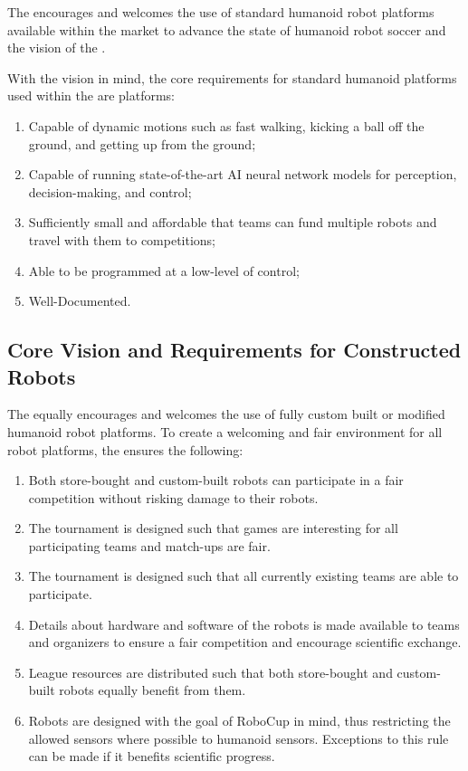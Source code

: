 The \leaguenameabbr encourages and welcomes the use of standard humanoid robot platforms available within the market to advance the state of humanoid robot soccer and the vision of the \leaguenameabbr.

With the \leaguenameabbr vision in mind, the core requirements for standard humanoid platforms used within the \leaguenameabbr are platforms:
\begin{enumerate}
    \item Capable of dynamic motions such as fast walking, kicking a ball off the ground, and getting up from the ground;
    \item Capable of running state-of-the-art AI neural network models for perception, decision-making, and control;
    \item Sufficiently small and affordable that teams can fund multiple robots and travel with them to competitions;
    \item Able to be programmed at a low-level of control;
    \item Well-Documented.
\end{enumerate}

\subsection{Core Vision and Requirements for Constructed Robots}

The \leaguenameabbr equally encourages and welcomes the use of fully custom built or modified humanoid robot platforms. To create a welcoming and fair environment for all robot platforms, the \leaguenameabbr ensures the following:
\begin{enumerate}
	\item Both store-bought and custom-built robots can participate in a fair competition without risking damage to their robots.
	\item The tournament is designed such that games are interesting for all participating teams and match-ups are fair.
	\item The tournament is designed such that all currently existing teams are able to participate.
	\item Details about hardware and software of the robots is made available to teams and organizers to ensure a fair competition and encourage scientific exchange.
	\item League resources are distributed such that both store-bought and custom-built robots equally benefit from them.
	\item Robots are designed with the goal of RoboCup in mind, thus restricting the allowed sensors where possible to humanoid sensors. Exceptions to this rule can be made if it benefits scientific progress.
\end{enumerate}

